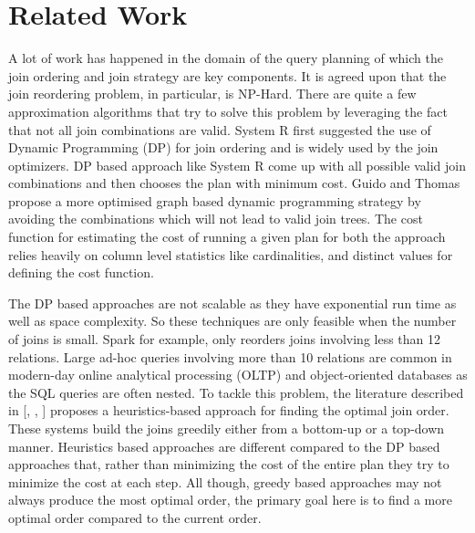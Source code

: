 \section{Related Work}
A lot of work has happened in the domain of the query planning of which the join ordering and join strategy are key components. It is agreed upon that the join reordering problem, in particular, is NP-Hard. There are quite a few approximation algorithms that try to solve this problem by leveraging the fact that not all join combinations are valid. System R \cite{b1} first suggested the use of Dynamic Programming (DP) for join ordering and is widely used by the join optimizers. DP based approach like System R come up with all possible valid join combinations and then chooses the plan with minimum cost. Guido and Thomas \cite{b3} propose a more optimised graph based dynamic programming strategy by avoiding the combinations which will not lead to valid join trees. The cost function for estimating the cost of running a given plan for both the approach relies heavily on column level statistics like cardinalities, and distinct values for defining the cost function.

The DP based approaches are not scalable as they have exponential run time as well as space complexity. So these techniques are only feasible when the number of joins is small. Spark for example, only reorders joins involving less than 12 relations. Large ad-hoc queries involving more than 10 relations are common in modern-day online analytical processing (OLTP) and object-oriented databases as the SQL queries are often nested. To tackle this problem,  the literature described in [\cite{b4}, \cite{b5}, \cite{b6}] proposes a heuristics-based approach for finding the optimal join order. These systems build the joins greedily either from a bottom-up or a top-down manner.  Heuristics based approaches are different compared to the DP based approaches that, rather than minimizing the cost of the entire plan they try to minimize the cost at each step. All though, greedy based approaches may not always produce the most optimal order, the primary goal here is to find a more optimal order compared to the current order.

